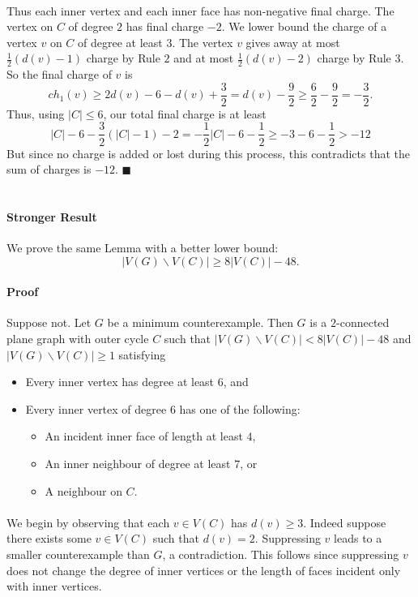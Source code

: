 \documentclass[letterpaper,12pt,oneside,onecolumn]{article}
\begin{document}
\paragraph{}
Thus each inner vertex and each inner face has non-negative final charge. The vertex on $C$ of degree $2$ has final charge $-2$. We lower bound the charge of a vertex $v$ on $C$ of degree at least $3$. The vertex $v$ gives away at most $\frac{1}{2}(d(v) - 1)$ charge by Rule $2$ and at most $\frac{1}{2}(d(v) - 2)$ charge by Rule $3$. So the final charge of $v$ is
$$ch_1(v) \geq 2d(v) - 6 - d(v) + \frac{3}{2} = d(v) - \frac{9}{2} \geq \frac{6}{2} - \frac{9}{2} = -\frac{3}{2}.$$
Thus, using $|C| \leq 6$, our total final charge is at least
$$|C| - 6 -\frac{3}{2}(|C| -1) - 2 = -\frac{1}{2}|C| - 6 -\frac{1}{2} \geq -3 -6 -\frac{1}{2} > -12$$
But since no charge is added or lost during this process, this contradicts that the sum of charges is $-12$. $\blacksquare$

\newpage
\section{}
\paragraph{Stronger Result}
We prove the same Lemma with a better lower bound: $$|V(G) \backslash V(C)| \geq 8|V(C)| - 48.$$ 
\paragraph{Proof}
Suppose not. Let $G$ be a minimum counterexample. Then $G$ is a $2$-connected plane graph with outer cycle $C$ such that $|V(G)\backslash V(C)| < 8|V(C)| - 48$ and $|V(G) \backslash V(C)| \geq 1$ satisfying
\begin{itemize}
	\item Every inner vertex has degree at least $6$, and
	\item Every inner vertex of degree $6$ has one of the following:
	\begin{itemize}
		\item An incident inner face of length at least $4$,
		\item An inner neighbour of degree at least $7$, or
		\item A neighbour on $C$.
	\end{itemize}
\end{itemize}
\paragraph{}
We begin by observing that each $v \in V(C)$ has $d(v) \geq 3$. Indeed suppose there exists some $v \in V(C)$ such that $d(v) = 2$. Suppressing $v$ leads to a smaller counterexample than $G$, a contradiction. This follows since suppressing $v$ does not change the degree of inner vertices or the length of faces incident only with inner vertices.
\end{document}
